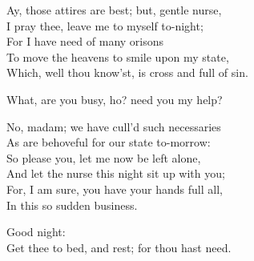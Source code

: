  
\begin{speech}
Ay, those attires are best; but, gentle nurse, \\

I pray thee, leave me to myself to-night; \\
For I have need of many orisons \\
To move the heavens to smile upon my state, \\
Which, well thou know'st, is cross and full of sin. 
\\
\end{speech}
\begin{speech}
What, are you busy, ho? need you my help? \\
\end{speech}
\begin{speech}
No, madam; we have cull'd such necessaries \\
As are behoveful for our state to-morrow: \\
So please you, let me now be left alone, \\
And let the nurse this night sit up with you; \\
For, I am sure, you have your hands full all, \\
In this so sudden business. \\
\end{speech}
\begin{speech}
Good night: \\
Get thee to bed, and rest; for thou hast need. 
\\
\end{speech}
